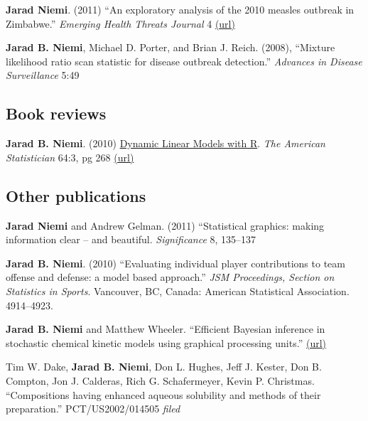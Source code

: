 \documentclass[overlapped,line]{res}
\begin{document}
\begin{resume}
{\bf Jarad Niemi}. (2011) ``An exploratory analysis of the 2010 measles outbreak in Zimbabwe.'' \emph{Emerging Health Threats Journal} 4 \href{http://dx.doi.org/10.3402/ehtj.v4i0.11907}{(url)}


{\bf Jarad B. Niemi}, Michael D. Porter, and Brian J. Reich. (2008), ``Mixture likelihood ratio scan statistic for disease outbreak detection.'' \emph{Advances in Disease Surveillance} 5:49

\subsection{\bf Book reviews}

{\bf Jarad B. Niemi}. (2010) \underline{Dynamic Linear Models with R}. \emph{The American Statistician} 64:3, pg 268 \href{http://dx.doi.org/10.1198/tast.2010.br643}{(url)}



\subsection{\bf Other publications}

{\bf Jarad Niemi } and Andrew Gelman. (2011) ``Statistical graphics: making information clear -- and beautiful. \emph{Significance} 8, 135--137

{\bf Jarad B. Niemi}. (2010) ``Evaluating individual player contributions to team offense and defense: a model based approach.'' \emph{JSM Proceedings, Section on Statistics in Sports}. Vancouver, BC, Canada: American Statistical Association. 4914--4923.

{\bf Jarad B. Niemi} and Matthew Wheeler. ``Efficient Bayesian inference in stochastic chemical kinetic models using graphical processing units.'' \href{http://arxiv.org/abs/1101.4242}{(url)}

Tim W. Dake, {\bf Jarad B. Niemi}, Don L. Hughes, Jeff J. Kester, Don B. Compton, Jon J. Calderas, Rich G. Schafermeyer, Kevin P. Christmas. ``Compositions having enhanced aqueous solubility and methods of their preparation.'' PCT/US2002/014505 \emph{filed}



\end{resume}
\end{document}
